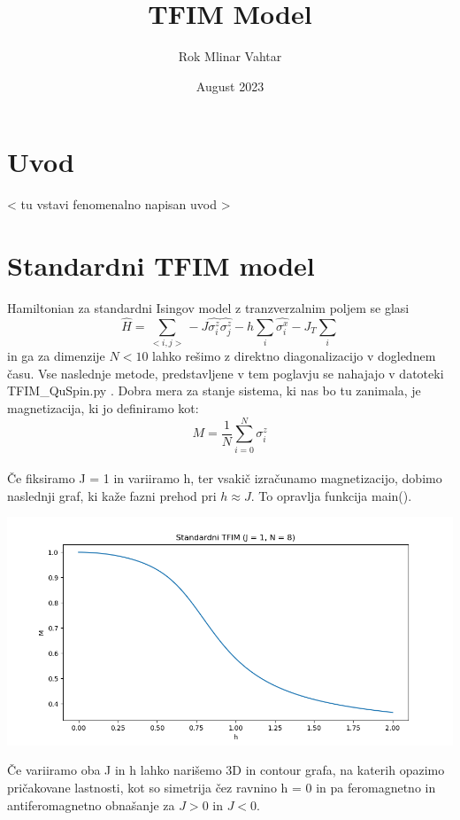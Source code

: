 \documentclass{article}
\title{\HUGE TFIM Model}
\author{Rok Mlinar Vahtar}
\date{August 2023}
\begin{document}
\maketitle

\section{Uvod}
\textless \hspace{1pt} tu vstavi fenomenalno napisan uvod \textgreater

\section{Standardni TFIM model}
Hamiltonian za standardni Isingov model z tranzverzalnim poljem se glasi
\begin{equation}
    \hat{H} = \sum_{< i,j >} -J \hat{\sigma_i^z} \hat{\sigma_j^z} - h\sum_i \hat{\sigma_i^x} - J_T \sum_i
\end{equation}
in ga za dimenzije $N < 10$ lahko rešimo z direktno diagonalizacijo v doglednem času. Vse naslednje metode, predstavljene v tem poglavju se nahajajo v datoteki TFIM\_QuSpin.py . Dobra mera za stanje sistema, ki nas bo tu zanimala, je magnetizacija, ki jo definiramo kot:
\begin{equation}
    M = \frac{1}{N}\sum_{i=0}^N \sigma_i^z
\end{equation}\\
Če fiksiramo J = 1 in variiramo h, ter vsakič izračunamo magnetizacijo, dobimo naslednji graf, ki kaže fazni prehod pri $h \approx J$. To opravlja funkcija main().

\includegraphics[width = \linewidth]{STFIM1.png}

\newpage
\noindent Če variiramo oba J in h lahko narišemo 3D in contour grafa, na katerih opazimo pričakovane lastnosti, kot so simetrija čez ravnino h = 0 in pa feromagnetno in antiferomagnetno obnašanje za $J > 0$ in $J < 0$.\\\\
\end{document}
